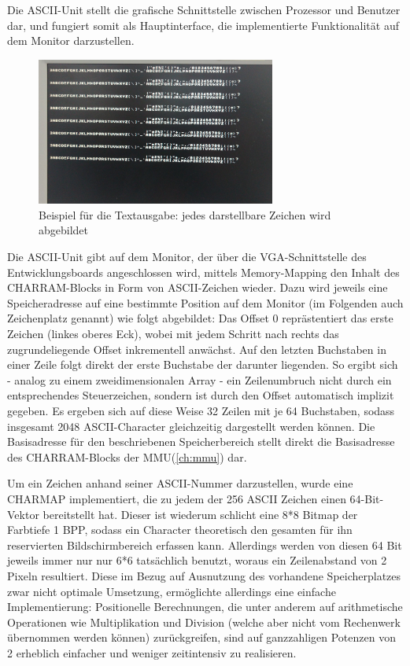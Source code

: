 
\label{ch:asciiunit}
Die ASCII-Unit stellt die grafische Schnittstelle zwischen Prozessor und Benutzer dar, und fungiert somit als Hauptinterface, die implementierte Funktionalit\"at auf dem Monitor darzustellen.

\begin{figure}[!htbp]
	\centering
	\label{fig:exampletext}
	\includegraphics[width=0.7\textwidth]{asciiunitexample.png}
	\caption[Beispiel f\"ur die Textausgabe]{Beispiel f\"ur die Textausgabe: jedes darstellbare Zeichen wird abgebildet}
\end{figure}


Die ASCII-Unit gibt auf dem Monitor, der \"uber die VGA-Schnittstelle des Entwicklungsboards angeschlossen wird, mittels Memory-Mapping den Inhalt des CHARRAM-Blocks in Form von ASCII-Zeichen wieder. Dazu wird jeweils eine Speicheradresse auf eine bestimmte Position auf dem Monitor (im Folgenden auch Zeichenplatz genannt) wie folgt abgebildet: Das Offset 0 repr\"astentiert das erste Zeichen (linkes oberes Eck), wobei mit jedem Schritt nach rechts das zugrundeliegende Offset inkrementell anw\"achst. Auf den letzten Buchstaben in einer Zeile folgt direkt der erste Buchstabe der darunter liegenden. So ergibt sich - analog zu einem zweidimensionalen Array - ein Zeilenumbruch nicht durch ein entsprechendes Steuerzeichen, sondern ist durch den Offset automatisch implizit gegeben. Es ergeben sich auf diese Weise 32 Zeilen mit je 64 Buchstaben, sodass insgesamt 2048 ASCII-Character gleichzeitig dargestellt werden k\"onnen. Die Basisadresse f\"ur den beschriebenen Speicherbereich stellt direkt die Basisadresse des CHARRAM-Blocks der MMU(\ref{ch:mmu}) dar.

Um ein Zeichen anhand seiner ASCII-Nummer darzustellen, wurde eine CHARMAP implementiert, die zu jedem der 256 ASCII Zeichen einen 64-Bit-Vektor bereitstellt hat. Dieser ist wiederum schlicht eine 8*8 Bitmap der Farbtiefe 1 BPP, sodass ein Character theoretisch den gesamten f\"ur ihn reservierten Bildschirmbereich erfassen kann. Allerdings  werden von diesen 64 Bit jeweils immer nur nur 6*6 tats\"achlich benutzt, woraus ein Zeilenabstand von 2 Pixeln resultiert. Diese im Bezug auf Ausnutzung des vorhandene Speicherplatzes zwar nicht optimale Umsetzung, erm\"oglichte allerdings eine einfache Implementierung: Positionelle Berechnungen, die unter anderem auf arithmetische Operationen wie Multiplikation und Division (welche aber nicht vom Rechenwerk \"ubernommen werden k\"onnen) zur\"uckgreifen, sind auf ganzzahligen Potenzen von 2 erheblich einfacher und weniger zeitintensiv zu realisieren.

